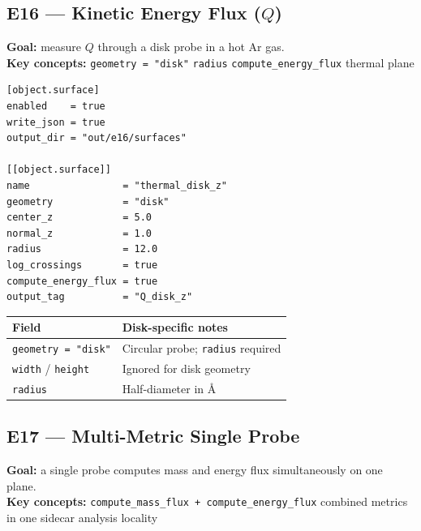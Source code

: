 \documentclass[11pt,a4paper]{article}
\begin{document}
\subsection*{E16 --- Kinetic Energy Flux ($Q$)}

\textbf{Goal:} measure $Q$ through a disk probe in a hot Ar gas.\\
\textbf{Key concepts:} \texttt{geometry = "disk"} \textbullet{}
\texttt{radius} \textbullet{} \texttt{compute\_energy\_flux} \textbullet{} thermal plane

\begin{tcolorbox}[scriptbox, scriptheader,
  title={scripts/e16\_surface\_energy\_flux.vsim}]
\begin{lstlisting}[style=vsimlst]
[object.surface]
enabled    = true
write_json = true
output_dir = "out/e16/surfaces"

[[object.surface]]
name                = "thermal_disk_z"
geometry            = "disk"
center_z            = 5.0
normal_z            = 1.0
radius              = 12.0
log_crossings       = true
compute_energy_flux = true
output_tag          = "Q_disk_z"
\end{lstlisting}
\end{tcolorbox}

\begin{center}\footnotesize
\begin{tabular}{@{}ll@{}}
\toprule
Field & Disk-specific notes \\
\midrule
\texttt{geometry = "disk"} & Circular probe; \texttt{radius} required \\
\texttt{width} / \texttt{height} & Ignored for disk geometry \\
\texttt{radius} & Half-diameter in \AA \\
\bottomrule
\end{tabular}
\end{center}

\subsection*{E17 --- Multi-Metric Single Probe}

\textbf{Goal:} a single probe computes mass and energy flux simultaneously on one plane.\\
\textbf{Key concepts:} \texttt{compute\_mass\_flux + compute\_energy\_flux}
\textbullet{} combined metrics in one sidecar \textbullet{} analysis locality
\end{document}
